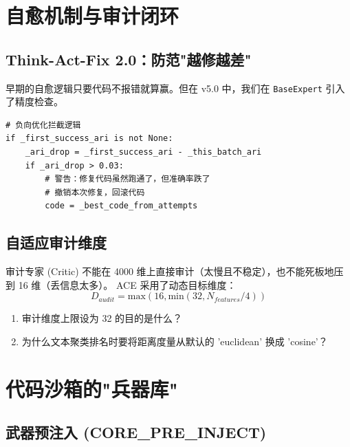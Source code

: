 \documentclass[11pt,a4paper]{ctexbook}
\begin{document}
\chapter{自愈机制与审计闭环}

\section{Think-Act-Fix 2.0：防范"越修越差"}

早期的自愈逻辑只要代码不报错就算赢。但在 v5.0 中，我们在 \texttt{BaseExpert} 引入了精度检查。

\begin{verbatim}
# 负向优化拦截逻辑
if _first_success_ari is not None:
    _ari_drop = _first_success_ari - _this_batch_ari
    if _ari_drop > 0.03:
        # 警告：修复代码虽然跑通了，但准确率跌了
        # 撤销本次修复，回滚代码
        code = _best_code_from_attempts
\end{verbatim}

\section{自适应审计维度}

审计专家 (Critic) 不能在 4000 维上直接审计（太慢且不稳定），也不能死板地压到 16 维（丢信息太多）。
ACE 采用了动态目标维度：
\begin{equation}
D_{audit} = \text{max}(16, \text{min}(32, N_{features} / 4))
\end{equation}

\begin{reviewbox}
    \begin{enumerate}
        \item 审计维度上限设为 32 的目的是什么？
        \item 为什么文本聚类排名时要将距离度量从默认的 'euclidean' 换成 'cosine'？
    \end{enumerate}
\end{reviewbox}

\chapter{代码沙箱的"兵器库"}

\section{武器预注入 (CORE\_PRE\_INJECT)}
\end{document}
